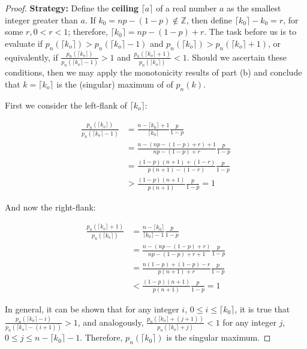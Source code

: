 \documentclass[10pt, oneside]{article}   	%
\theoremstyle{definition}
\begin{document}
\begin{enumerate}[label=4.\arabic*]
\begin{enumerate}
	\begin{proof}\textbf{Strategy:} Define the \textbf{ceiling} $\lceil a \rceil$ of a real number $a$ as the smallest integer greater than $a$. If $k_0 = np - (1-p) \notin \mathbb{Z}$, then define $\lceil k_0 \rceil - k_0 = r$, for some $r, 0 < r < 1$; therefore, $\lceil k_0 \rceil = np - (1-p) + r$. The task before us is to evaluate if $p_n (\lceil k_o \rceil) > p_n (\lceil k_o \rceil - 1)$ and $p_n (\lceil k_o \rceil) > p_n (\lceil k_o \rceil + 1)$, or equivalently, if $\frac{p_n (\lceil k_o \rceil)}{p_n (\lceil k_o \rceil - 1)} > 1$ and $\frac{p_n (\lceil k_o \rceil + 1)}{p_n (\lceil k_o \rceil) } < 1$. Should we ascertain these conditions, then we may apply the monotonicity results of part (b) and conclude that $k = \lceil k_o \rceil$ is the (singular) maximum of of $p_n(k)$.
	
	First we consider the left-flank of $\lceil k_o \rceil$:
	
	\begin{align*}
	\frac{p_n (\lceil k_o \rceil)}{p_n (\lceil k_o \rceil - 1)} &= \frac{n - \lceil k_0 \rceil + 1}{\lceil k_0 \rceil} \frac{p}{1-p} \\
	&= \frac{n - ( np - (1-p) + r ) + 1}{np - (1-p) + r} \frac{p}{1-p} \\
	&= \frac{(1-p)(n+1) + (1-r)}{p(n+1) - (1-r)} \frac{p}{1-p} \\
	&> \frac{(1-p)(n+1)}{p(n+1)} \frac{p}{1-p} = 1
	\end{align*}
	
	And now the right-flank:
	
	\begin{align*}
	\frac{p_n (\lceil k_o \rceil + 1)}{p_n (\lceil k_o \rceil)} &= \frac{n - \lceil k_0 \rceil}{\lceil k_0 \rceil - 1} \frac{p}{1-p} \\
	&= \frac{n - (np - (1-p) + r)}{np - (1-p) + r + 1} \frac{p}{1-p} \\
	&= \frac{n (1-p) + (1-p) - r}{p(n+1) + r} \frac{p}{1-p} \\
	&< \frac{(1-p)(n+1)}{p(n+1)} \frac{p}{1-p} = 1
	\end{align*}
	
	In general, it can be shown that for any integer $i$, $0 \leq i \leq \lceil k_0 \rceil$, it is true that $\frac{p_n (\lceil k_o \rceil - i)}{p_n (\lceil k_o \rceil - (i+1))} > 1$, and analogously, $\frac{p_n (\lceil k_o \rceil + (j + 1))}{p_n (\lceil k_o \rceil + j)} < 1$ for any integer $j$, $0 \leq j \leq n - \lceil k_0 \rceil - 1$. Therefore, $p_n (\lceil k_0 \rceil)$ is the singular maximum.
	

\end{proof}
\end{enumerate}
\end{enumerate}
\end{document}

